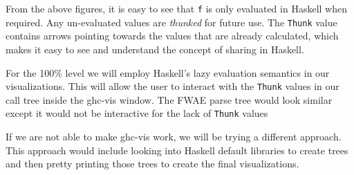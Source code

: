 \documentclass[format=acmlarge, review=false, nonacm=false, screen=true]{acmart}
\begin{document}
From the above figures, it is easy to see that \texttt{f} is only evaluated in Haskell when required. Any un-evaluated values are \textit{thunked} for future use. The \texttt{Thunk} value contains arrows pointing towards the values that are already calculated, which makes it easy to see and understand the concept of sharing in Haskell.

For the 100\% level we will employ Haskell's lazy evaluation semantics in our visualizations. This will allow the user to interact with the \texttt{Thunk} values in our call tree inside the ghc-vis window. The FWAE parse tree would look similar except it would not be interactive for the lack of \texttt{Thunk} values

If we are not able to make ghc-vis work, we will be trying a different approach. This approach would include looking into Haskell default libraries to create trees and then pretty printing those trees to create the final visualizations.
\end{document}
